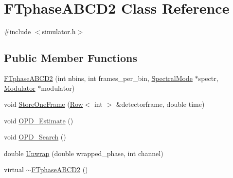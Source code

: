 \hypertarget{classFTphaseABCD2}{
\section{FTphaseABCD2 Class Reference}
\label{classFTphaseABCD2}
}


{\ttfamily \#include $<$simulator.h$>$}

\subsection*{Public Member Functions}
\begin{DoxyCompactItemize}
\item 
\hyperlink{classFTphaseABCD2_a53e40632beeadc5eb5c1f70a6bbce9f3}{FTphaseABCD2} (int nbins, int frames\_\-per\_\-bin, \hyperlink{classSpectralMode}{SpectralMode} $\ast$spectr, \hyperlink{classModulator}{Modulator} $\ast$modulator)
\item 
void \hyperlink{classFTphaseABCD2_aa6c06992bf50c3b129f07d6e6ecc72a3}{StoreOneFrame} (\hyperlink{classRow}{Row}$<$ int $>$ \&detectorframe, double time)
\item 
void \hyperlink{classFTphaseABCD2_a9f110f8b7c7ea884961e746cdfe50e9d}{OPD\_\-Estimate} ()
\item 
void \hyperlink{classFTphaseABCD2_a3cf90485f77c81b1006c06896d066786}{OPD\_\-Search} ()
\item 
double \hyperlink{classFTphaseABCD2_ae26e64b229a3e52ac7238ec7d95419c1}{Unwrap} (double wrapped\_\-phase, int channel)
\item 
virtual \hyperlink{classFTphaseABCD2_a52e1f405aa79ffacb0cd92da03e3c61e}{$\sim$FTphaseABCD2} ()
\end{DoxyCompactItemize}
